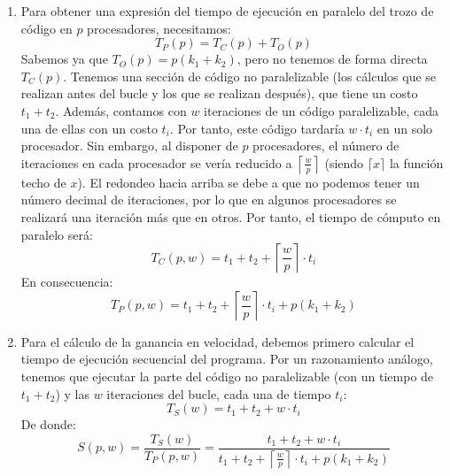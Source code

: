 \begin{ejercicio}
    \begin{enumerate}
        \item Para obtener una expresión del tiempo de ejecución en paralelo del trozo de código en $p$ procesadores, necesitamos:
            \begin{equation*}
                T_P(p) = T_C(p) + T_O(p)
            \end{equation*}
            Sabemos ya que $T_O(p) = p(k_1 + k_2)$, pero no tenemos de forma directa $T_C(p)$.
            Tenemos una sección de código no paralelizable (los cálculos que se realizan antes del bucle y los que se realizan después), que tiene un costo $t_1+t_2$. Además, contamos con $w$ iteraciones de un código paralelizable, cada una de ellas con un costo $t_i$. Por tanto, este código tardaría $w\cdot t_i$ en un solo procesador.
            Sin embargo, al disponer de $p$ procesadores, el número de iteraciones en cada procesador se vería reducido a $\left\lceil \frac{w}{p}\right\rceil$ (siendo $\lceil x \rceil$ la función techo de $x$). El redondeo hacia arriba se debe a que no podemos tener un número decimal de iteraciones, por lo que
            en algunos procesadores se realizará una iteración más que en otros. Por tanto, el tiempo de cómputo en paralelo será:
            \begin{equation*}
                T_C(p, w) = t_1 + t_2 + \left\lceil \frac{w}{p}\right\rceil \cdot t_i
            \end{equation*}
            En consecuencia:
            \begin{equation*}
                T_P(p, w) = t_1 + t_2 + \left\lceil \frac{w}{p}\right\rceil \cdot t_i + p(k_1+k_2)
            \end{equation*}
        \item Para el cálculo de la ganancia en velocidad, debemos primero calcular el tiempo de ejecución secuencial del programa. Por un razonamiento análogo, tenemos que ejecutar la parte del código no paralelizable (con un tiempo de $t_1 + t_2$) y las $w$ iteraciones del bucle, cada una de tiempo $t_i$:
            \begin{equation*}
                T_S(w) = t_1 + t_2 + w\cdot t_i
            \end{equation*}
            De donde:
            \begin{equation*}
                S(p, w) = \dfrac{T_S(w)}{T_P(p, w)} = \dfrac{t_1 + t_2 + w\cdot t_i}{t_1 + t_2 + \left\lceil \frac{w}{p}\right\rceil \cdot t_i + p(k_1 + k_2)}
            \end{equation*}


\end{enumerate}
\end{ejercicio}
